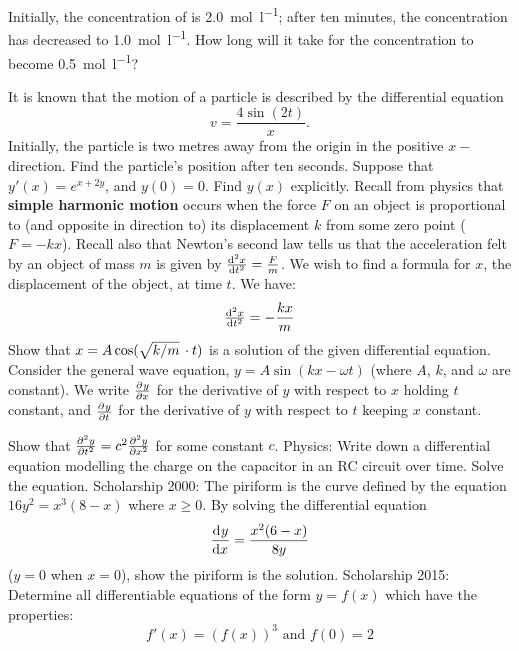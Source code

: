 \begin{questions}
\begin{parts}
            Initially, the concentration of  is \SI{2.0}{\mole\per\litre}; after ten minutes, the concentration has decreased to \SI{1.0}{\mole\per\litre}. How
            long will it take for the concentration to become \SI{0.5}{\mole\per\litre}?
    \end{parts}
  \questioM It is known that the motion of a particle is described by the differential equation
            \begin{displaymath}
              v = \frac{4\sin(2t)}{x}.
            \end{displaymath}
            Initially, the particle is two metres away from the origin in the positive $x-$direction.
            Find the particle's position after ten seconds.
  \questioM Suppose that $ y'(x) = e^{x + 2y} $, and $ y(0) = 0 $. Find $ y(x) $ explicitly.
  \questioM Recall from physics that \textbf{simple harmonic motion} occurs when the force $ F $ on an object is proportional to (and opposite
            in direction to) its displacement $ k $ from some zero point ($ F = -kx $). Recall also that Newton's second law tells us that the
            acceleration felt by an object of mass $ m $ is given by $ \od[2]{x}{t} = \frac{F}{m} $. We wish to find a formula for $ x $, the
            displacement of the object, at time $ t $. We have:
            \begin{displaymath}
              \od[2]{x}{t} = -\frac{kx}{m}
            \end{displaymath}
            Show that $ x = A \cos(\sqrt{k/m} \thinspace\cdot t) $ is a solution of the given differential equation.
  \questioS Consider the general wave equation, $ y = A\sin(kx -\omega t) $ (where $A$, $ k $, and $ \omega $ are constant). We
            write $ \pd{y}{x} $ for the derivative of $ y $ with respect to $ x $ holding $ t $ constant, and $ \pd{y}{t} $ for
            the derivative of $ y $ with respect to $ t $ keeping $ x $ constant.

            Show that $ \pd[2]{y}{t} = c^2 \pd[2]{y}{x} $ for some constant $ c $.
  \questioS Physics: Write down a differential equation modelling the charge on the capacitor in an RC circuit over time. Solve the equation.
  \questioS Scholarship 2000: The piriform is the curve defined by the equation $ 16y^2 = x^3(8-x) $ where $ x \geq 0 $.
            By solving the differential equation
            \begin{displaymath}
              \dod{y}{x} = \frac{x^2(6-x)}{8y}
            \end{displaymath}
            ($ y = 0 $ when $ x = 0 $), show the piriform is the solution.
  \questioS Scholarship 2015: Determine all differentiable equations of the form $ y = f(x) $ which have the properties:
    \begin{displaymath}
      f'(x) = (f(x))^3 \text{ and } f(0) = 2
    \end{displaymath}
\end{questions}

